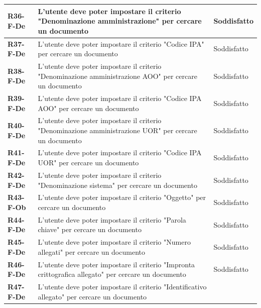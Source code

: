 \documentclass[a4paper,12pt]{article}
\begin{document}
{{{\begin{longtable}{|>{\centering\arraybackslash}m{}|>{\centering\arraybackslash}m{}|>{\centering\arraybackslash}m{}|}
                \hline
                \textbf{R36-F-De} & L'utente deve poter impostare il criterio "Denominazione amministrazione" per cercare un documento & 
                Soddisfatto \\
                \hline
                \textbf{R37-F-De} & L'utente deve poter impostare il criterio "Codice IPA" per cercare un documento & 
                Soddisfatto \\
                \hline
                \textbf{R38-F-De} & L'utente deve poter impostare il criterio "Denominazione amministrazione AOO" per cercare un documento & 
                Soddisfatto \\
                \hline
                \textbf{R39-F-De} & L'utente deve poter impostare il criterio "Codice IPA AOO" per cercare un documento & 
                Soddisfatto \\
                \hline
                \textbf{R40-F-De} & L'utente deve poter impostare il criterio "Denominazione amministrazione UOR" per cercare un documento & 
                Soddisfatto \\
                \hline
                \textbf{R41-F-De} & L'utente deve poter impostare il criterio "Codice IPA UOR" per cercare un documento & 
                Soddisfatto \\
                \hline
                \textbf{R42-F-De} & L'utente deve poter impostare il criterio "Denominazione sistema" per cercare un documento & 
                Soddisfatto \\ 
                \hline
                \textbf{R43-F-Ob} & L'utente deve poter impostare il criterio "Oggetto" per cercare un documento & 
                Soddisfatto \\ 
                \hline
                \textbf{R44-F-De} & L'utente deve poter impostare il criterio "Parola chiave" per cercare un documento & 
                Soddisfatto \\ 
                \hline
                \textbf{R45-F-De} & L'utente deve poter impostare il criterio "Numero allegati" per cercare un documento & 
                Soddisfatto \\ 
                \hline
                \textbf{R46-F-De} & L'utente deve poter impostare il criterio "Impronta crittografica allegato" per cercare un documento & 
                Soddisfatto \\ 
                \hline
                \textbf{R47-F-De} & L'utente deve poter impostare il criterio "Identificativo allegato" per cercare un documento & 

\end{longtable}}}}
\end{document}
